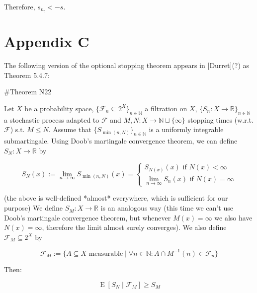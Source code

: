 \documentclass[a4paper]{article}
\DeclareMathOperator{\E}{E}
\newcommand{\Nats}{\mathbb{N}}
\newcommand{\Reals}{\mathbb{R}}
\newcommand{\Sq}[2]{\{#1\}_{#2 \in \Nats}}
\newcommand{\Sqn}[1]{\Sq{#1}{n}}
\newcommand{\F}{\mathcal{F}}
\begin{document}
Therefore, ${s_{n_l} < -s}$. 

\section{Appendix C}

The following version of the optional stopping theorem appears in [Durret](?) as Theorem 5.4.7:

\#Theorem N22

Let ${X}$ be a probability space, ${\Sqn{\F_n \subseteq 2^X}}$ a filtration on ${X}$, ${\Sqn{S_n: X \rightarrow \Reals}}$ a stochastic process adapted to ${\F}$ and ${M,N: X \rightarrow \Nats \sqcup \{\infty\}}$ stopping times (w.r.t. ${\F}$) s.t. ${M \leq N}$. Assume that ${\Sqn{S_{\min(n,N)}}}$ is a uniformly integrable submartingale. Using Doob's martingale convergence theorem, we can define ${S_N : X \rightarrow \Reals}$ by

$$S_N(x):=\lim_{n \rightarrow \infty} S_{\min(n,N)}(x)=\begin{cases}S_{N(x)}(x) \text{ if } N(x) < \infty\\\lim_{n \rightarrow \infty} S_n(x) \text{ if } N(x) = \infty\end{cases}$$

(the above is well-defined *almost* everywhere, which is sufficient for our purpose) We define ${S_M: X \rightarrow \Reals}$ is an analogous way (this time we can't use Doob's martingale convergence theorem, but whenever ${M(x) = \infty}$ we also have ${N(x) = \infty}$, therefore the limit almost surely converges). We also define ${\F_M \subseteq 2^X}$ by

$$\F_M:=\{A \subseteq X \text{ measurable} \mid \forall n \in \Nats: A \cap M^{-1}(n) \in \F_n\}$$

Then:

$$\E[S_N \mid \F_M] \geq S_M$$
\end{document}
